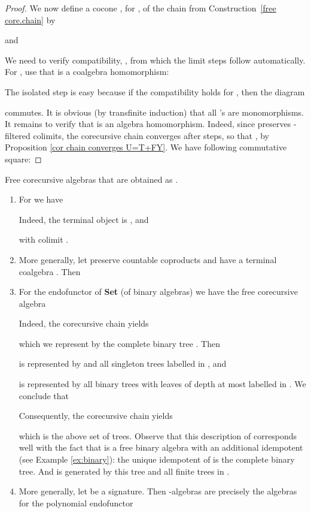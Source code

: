 \documentclass{LMCS}
\theoremstyle{plain}
\theoremstyle{definition}
\numberwithin{equation}{section}
\begin{document}
\begin{defi}
\begin{proof}
We now define a cocone , for , of
the chain from Construction~\ref{free core.chain} by

and

We need to verify compatibility, , from which the limit steps follow automatically. For , use that  is a coalgebra homomorphism:

The isolated  step is easy because if the compatibility holds for , then the diagram

commutes. It is obvious (by transfinite induction) that all 's
are monomorphisms. It remains to verify that
 is an algebra
homomorphism. Indeed, since  preserves -filtered colimits,
the corecursive chain  converges after  steps, so that , by Proposition \ref{cor chain converges U=T+FY}. We have following commutative square:


\vspace*{-20pt}
\end{proof}

\begin{exa}\label{some exams}
Free corecursive algebras  that are obtained as .
\begin{enumerate}
\item For  we have

Indeed, the terminal object  is , and

with colimit .

\item More generally, let  preserve countable coproducts and have a terminal coalgebra . Then 

\item For the endofunctor  of {\bf Set} (of binary algebras) we have the free corecursive algebra

Indeed, the corecursive chain  yields

which we represent by the complete binary tree . Then

is represented by  and all singleton trees labelled in , and

is represented by all binary trees with leaves of depth at most  labelled in .
We conclude that

Consequently, the corecursive chain yields

which is the above set of trees. Observe that this description of 
corresponds well with the fact that  is a free binary algebra with
an additional idempotent (see Example \ref{ex:binary}): the unique
idempotent of  is the complete binary tree. And  is generated
by this tree and all finite trees in .

\item More generally, let  be a signature. Then -algebras are precisely the algebras for the polynomial
endofunctor


\end{enumerate}
\end{exa}
\end{defi}
\end{document}
